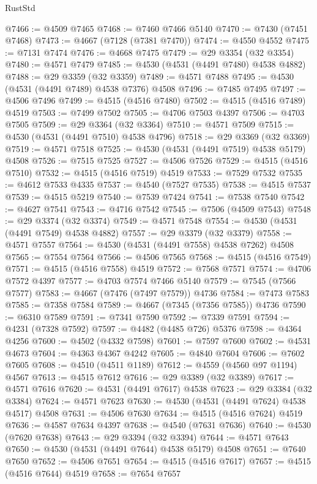 \begin{lexlean}{RustStd}
\begin{coremodule}
@7466 := @4509 @7465
@7468 := @7460 @7466 @5140
@7470 := @7430 (@7451 @7468)
@7473 := @4667 (@7128 (@7381 @7470))
@7474 := @4550 @4552
@7475 := @7131 @7474
@7476 := @4668 @7475
@7479 := @29 @3354 (@32 @3354)
@7480 := @4571 @7479
@7485 := @4530 (@4531 (@4491 @7480) @4538 @4882)
@7488 := @29 @3359 (@32 @3359)
@7489 := @4571 @7488
@7495 := @4530 (@4531 (@4491 @7489) @4538 @7376) @4508
@7496 := @7485 @7495
@7497 := @4506 @7496
@7499 := @4515 (@4516 @7480)
@7502 := @4515 (@4516 @7489) @4519
@7503 := @7499 @7502
@7505 := @4706 @7503 @4397
@7506 := @4703 @7505
@7509 := @29 @3364 (@32 @3364)
@7510 := @4571 @7509
@7515 := @4530 (@4531 (@4491 @7510) @4538 @4796)
@7518 := @29 @3369 (@32 @3369)
@7519 := @4571 @7518
@7525 := @4530 (@4531 (@4491 @7519) @4538 @5179) @4508
@7526 := @7515 @7525
@7527 := @4506 @7526
@7529 := @4515 (@4516 @7510)
@7532 := @4515 (@4516 @7519) @4519
@7533 := @7529 @7532
@7535 := @4612 @7533 @4335
@7537 := @4540 (@7527 @7535)
@7538 := @4515 @7537
@7539 := @4515 @5219
@7540 := @7539 @7424
@7541 := @7538 @7540
@7542 := @4627 @7541
@7543 := @4716 @7542
@7545 := @7506 (@4509 @7543)
@7548 := @29 @3374 (@32 @3374)
@7549 := @4571 @7548
@7554 := @4530 (@4531 (@4491 @7549) @4538 @4882)
@7557 := @29 @3379 (@32 @3379)
@7558 := @4571 @7557
@7564 := @4530 (@4531 (@4491 @7558) @4538 @7262) @4508
@7565 := @7554 @7564
@7566 := @4506 @7565
@7568 := @4515 (@4516 @7549)
@7571 := @4515 (@4516 @7558) @4519
@7572 := @7568 @7571
@7574 := @4706 @7572 @4397
@7577 := @4703 @7574 @7466 @5140
@7579 := @7545 (@7566 @7577)
@7583 := @4667 (@7476 (@7497 @7579)) @4736
@7584 := @7473 @7583
@7585 := @7358 @7584
@7589 := @4667 (@7345 (@7356 @7585)) @4736
@7590 := @6310 @7589
@7591 := @7341 @7590
@7592 := @7339 @7591
@7594 := @4231 (@7328 @7592)
@7597 := @4482 (@4485 @726) @5376
@7598 := @4364 @4256
@7600 := @4502 (@4332 @7598)
@7601 := @7597 @7600
@7602 := @4531 @4673
@7604 := @4363 @4367 @4242
@7605 := @4840 @7604
@7606 := @7602 @7605
@7608 := @4510 (@4511 @1189)
@7612 := @4559 (@4560 @97 @1194) @4567
@7613 := @4515 @7612
@7616 := @29 @3389 (@32 @3389)
@7617 := @4571 @7616
@7620 := @4531 (@4491 @7617) @4538
@7623 := @29 @3384 (@32 @3384)
@7624 := @4571 @7623
@7630 := @4530 (@4531 (@4491 @7624) @4538 @4517) @4508
@7631 := @4506 @7630
@7634 := @4515 (@4516 @7624) @4519
@7636 := @4587 @7634 @4397
@7638 := @4540 (@7631 @7636)
@7640 := @4530 (@7620 @7638)
@7643 := @29 @3394 (@32 @3394)
@7644 := @4571 @7643
@7650 := @4530 (@4531 (@4491 @7644) @4538 @5179) @4508
@7651 := @7640 @7650
@7652 := @4506 @7651
@7654 := @4515 (@4516 @7617)
@7657 := @4515 (@4516 @7644) @4519
@7658 := @7654 @7657

\end{coremodule}
\end{lexlean}
